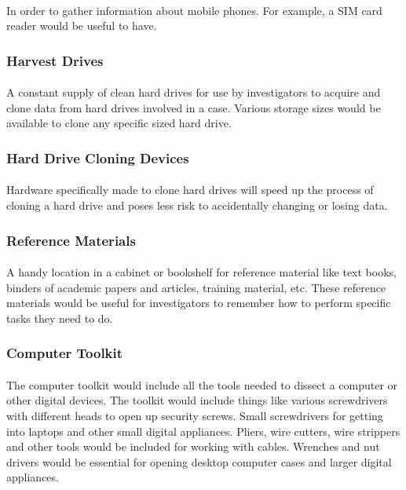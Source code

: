 \documentclass[12pt]{article}
\begin{document}
\paragraph{}
In order to gather information about mobile phones. For example, a SIM card reader would be useful to have.
\subsubsection{Harvest Drives}
\paragraph{}
A constant supply of clean hard drives for use by investigators to acquire and clone data from hard drives involved in a case.
Various storage sizes would be available to clone any specific sized hard drive.
\subsubsection{Hard Drive Cloning Devices}
\paragraph{}
Hardware specifically made to clone hard drives will speed up the process of cloning a hard drive and poses less risk to accidentally changing or losing data.
\subsubsection{Reference Materials}
\paragraph{}
A handy location in a cabinet or bookshelf for reference material like text books, binders of academic papers and articles, training material, etc.
These reference materials would be useful for investigators to remember how to perform specific tasks they need to do.
\subsubsection{Computer Toolkit}
\paragraph{}
The computer toolkit would include all the tools needed to dissect a computer or other digital devices.
The toolkit would include things like various screwdrivers with different heads to open up security screws. 
Small screwdrivers for getting into laptops and other small digital appliances. 
Pliers, wire cutters, wire strippers and other tools would be included for working with cables. 
Wrenches and nut drivers would be essential for opening desktop computer cases and larger digital appliances. 
\end{document}
